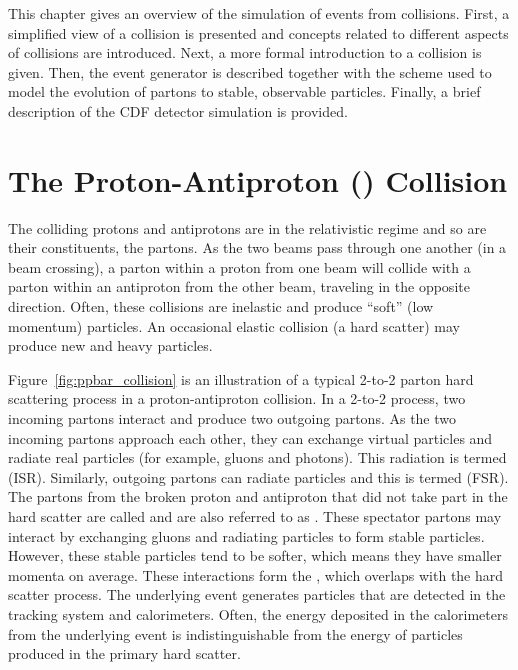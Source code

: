 \vspace{0.015\textheight}
This chapter gives an overview of the simulation of events from \ppbar collisions. First, a simplified view of a \ppbar collision is presented and concepts related to different aspects of \ppbar collisions are introduced. Next, a more formal introduction to a \ppbar collision is given. Then, the \pythiaText event generator is described together with the scheme used to model the evolution of partons to stable, observable particles. Finally, a brief description of the CDF detector simulation is provided.

\section{The Proton-Antiproton (\ppbar) Collision}
The colliding protons and antiprotons are in the relativistic regime and so are their constituents, the partons. As the two beams pass through one another (in a beam crossing), a parton within a proton from one beam will collide with a parton within an antiproton from the other beam, traveling in the opposite direction. Often, these collisions are inelastic and produce ``soft'' (low momentum) particles. An occasional elastic collision (a hard scatter) may produce new and heavy particles. %

Figure~\ref{fig:ppbar_collision} is an illustration of a typical 2-to-2 parton hard scattering process in a proton-antiproton collision. In a 2-to-2 process, two incoming partons interact and produce two outgoing partons. As the two incoming partons approach each other, they can exchange virtual particles and radiate real particles (for example, gluons and photons). This radiation is termed  (ISR). Similarly, outgoing partons can radiate particles and this is termed  (FSR). The partons from the broken proton and antiproton that did not take part in the hard scatter are called  and are also referred to as . These spectator partons may interact by exchanging gluons and radiating particles to form stable particles. However, these stable particles tend to be softer, which means they have smaller momenta on average. These interactions form the , which overlaps with the hard scatter process. The underlying event generates particles that are detected in the tracking system and calorimeters. Often, the energy deposited in the calorimeters from the underlying event is indistinguishable from the energy of particles produced in the primary hard scatter.

